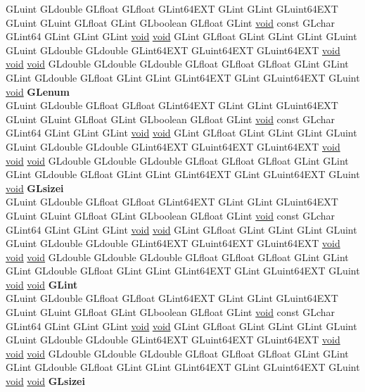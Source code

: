 \begin{DoxyCompactItemize}
\begin{tabbing}
\>GLuint GLdouble GLfloat GLfloat GLint64EXT GLint GLint GLuint64EXT GLuint GLuint GLfloat GLint GLboolean GLfloat GLint \hyperlink{interfacevoid}{void} const GLchar GLint64 GLint GLint GLint \hyperlink{interfacevoid}{void} \hyperlink{interfacevoid}{void} GLint GLfloat GLint GLint GLint GLuint GLuint GLdouble GLdouble GLint64EXT GLuint64EXT GLuint64EXT \hyperlink{interfacevoid}{void} \hyperlink{interfacevoid}{void} \hyperlink{interfacevoid}{void} GLdouble GLdouble GLdouble GLfloat GLfloat GLfloat GLint GLint GLint GLdouble GLfloat GLint GLint GLint64EXT GLint GLuint64EXT GLuint \hyperlink{interfacevoid}{void} {\bfseries GLenum}\\
\>GLuint GLdouble GLfloat GLfloat GLint64EXT GLint GLint GLuint64EXT GLuint GLuint GLfloat GLint GLboolean GLfloat GLint \hyperlink{interfacevoid}{void} const GLchar GLint64 GLint GLint GLint \hyperlink{interfacevoid}{void} \hyperlink{interfacevoid}{void} GLint GLfloat GLint GLint GLint GLuint GLuint GLdouble GLdouble GLint64EXT GLuint64EXT GLuint64EXT \hyperlink{interfacevoid}{void} \hyperlink{interfacevoid}{void} \hyperlink{interfacevoid}{void} GLdouble GLdouble GLdouble GLfloat GLfloat GLfloat GLint GLint GLint GLdouble GLfloat GLint GLint GLint64EXT GLint GLuint64EXT GLuint \hyperlink{interfacevoid}{void} {\bfseries GLsizei}\\
\>GLuint GLdouble GLfloat GLfloat GLint64EXT GLint GLint GLuint64EXT GLuint GLuint GLfloat GLint GLboolean GLfloat GLint \hyperlink{interfacevoid}{void} const GLchar GLint64 GLint GLint GLint \hyperlink{interfacevoid}{void} \hyperlink{interfacevoid}{void} GLint GLfloat GLint GLint GLint GLuint GLuint GLdouble GLdouble GLint64EXT GLuint64EXT GLuint64EXT \hyperlink{interfacevoid}{void} \hyperlink{interfacevoid}{void} \hyperlink{interfacevoid}{void} GLdouble GLdouble GLdouble GLfloat GLfloat GLfloat GLint GLint GLint GLdouble GLfloat GLint GLint GLint64EXT GLint GLuint64EXT GLuint \hyperlink{interfacevoid}{void} \hyperlink{interfacevoid}{void} {\bfseries GLint}\\
\>GLuint GLdouble GLfloat GLfloat GLint64EXT GLint GLint GLuint64EXT GLuint GLuint GLfloat GLint GLboolean GLfloat GLint \hyperlink{interfacevoid}{void} const GLchar GLint64 GLint GLint GLint \hyperlink{interfacevoid}{void} \hyperlink{interfacevoid}{void} GLint GLfloat GLint GLint GLint GLuint GLuint GLdouble GLdouble GLint64EXT GLuint64EXT GLuint64EXT \hyperlink{interfacevoid}{void} \hyperlink{interfacevoid}{void} \hyperlink{interfacevoid}{void} GLdouble GLdouble GLdouble GLfloat GLfloat GLfloat GLint GLint GLint GLdouble GLfloat GLint GLint GLint64EXT GLint GLuint64EXT GLuint \hyperlink{interfacevoid}{void} \hyperlink{interfacevoid}{void} {\bfseries GLsizei}\\

\end{tabbing}
\end{DoxyCompactItemize}
